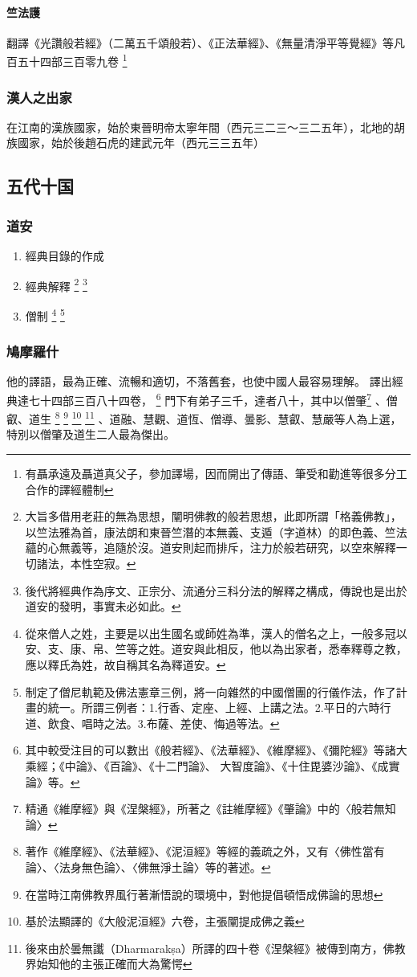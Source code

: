 \paragraph{竺法護}翻譯《光讚般若經》（二萬五千頌般若）、《正法華經》、《無量清淨平等覺經》等凡百五十四部三百零九卷
\footnote{有聶承遠及聶道真父子，參加譯場，因而開出了傳語、筆受和勸進等很多分工合作的譯經體制}
\subsubsection{漢人之出家}
在江南的漢族國家，始於東晉明帝太寧年間（西元三二三～三二五年），北地的胡族國家，始於後趙石虎的建武元年（西元三三五年）

\subsection{五代十国}
\subsubsection{道安}
\begin{enumerate}
  \item 經典目錄的作成
  \item 經典解釋
    \footnote{大旨多借用老莊的無為思想，闡明佛教的般若思想，此即所謂「格義佛教」，以竺法雅為首，康法朗和東晉竺潛的本無義、支遁（字道林）的即色義、竺法蘊的心無義等，追隨於沒。道安則起而排斥，注力於般若研究，以空來解釋一切諸法，本性空寂。}
    \footnote{後代將經典作為序文、正宗分、流通分三科分法的解釋之構成，傳說也是出於道安的發明，事實未必如此。}
  \item 僧制
    \footnote{從來僧人之姓，主要是以出生國名或師姓為準，漢人的僧名之上，一般多冠以安、支、康、帛、竺等之姓。道安與此相反，他以為出家者，悉奉釋尊之教，應以釋氏為姓，故自稱其名為釋道安。}
    \footnote{制定了僧尼軌範及佛法憲章三例，將一向雜然的中國僧團的行儀作法，作了計畫的統一。所謂三例者：1.行香、定座、上經、上講之法。2.平日的六時行道、飲食、唱時之法。3.布薩、差使、悔過等法。}
\end{enumerate}
\subsubsection{鳩摩羅什}
他的譯語，最為正確、流暢和適切，不落舊套，也使中國人最容易理解。
譯出經典達七十四部三百八十四卷，
\footnote{其中較受注目的可以數出《般若經》、《法華經》、《維摩經》、《彌陀經》等諸大乘經；《中論》、《百論》、《十二門論》、 大智度論》、《十住毘婆沙論》、《成實論》等。}
門下有弟子三千，達者八十，其中以僧肇\footnote{精通《維摩經》與《涅槃經》，所著之《註維摩經》《肇論》中的〈般若無知論〉}
、僧叡、道生
\footnote{著作《維摩經》、《法華經》、《泥洹經》等經的義疏之外，又有〈佛性當有論〉、〈法身無色論〉、〈佛無淨土論〉等的著述。}
\footnote{在當時江南佛教界風行著漸悟說的環境中，對他提倡頓悟成佛論的思想}
\footnote{基於法顯譯的《大般泥洹經》六卷，主張闡提成佛之義}
\footnote{後來由於曇無讖（Dharmarakṣa）所譯的四十卷《涅槃經》被傳到南方，佛教界始知他的主張正確而大為驚愕}
、道融、慧觀、道恆、僧導、曇影、慧叡、慧嚴等人為上選，特別以僧肇及道生二人最為傑出。
